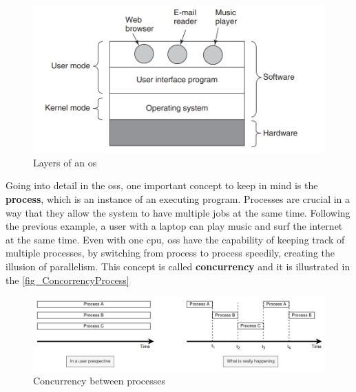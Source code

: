 \begin{figure}[H]
	\centering
 	\includegraphics[width=0.6\linewidth]{Images/OS_overview.png}
 	\caption{Layers of an \gls{os} \cite{OSbook} }
	 \label{fig_OSoverview}
\end{figure}



Going into detail in the \glspl{os}, one important concept to keep in mind is the \textbf{process}, which is an instance of an executing program. Processes are crucial in a way that they allow the system to have multiple jobs at the same time. Following the previous example, a user with a laptop can play music and surf the internet at the same time. Even with one \gls{cpu}, \glspl{os} have the capability of keeping track of multiple processes, by switching from process to process speedily, creating the illusion of parallelism. This concept is called \textbf{concurrency} and it is illustrated in the \autoref{fig_ConcorrencyProcess}

\begin{figure}[H]
	\centering
 	\includegraphics[width=1\linewidth]{Images/ConcorrencyProcess.png}
 	\caption{ Concurrency between processes }
	 \label{fig_ConcorrencyProcess}
\end{figure}


